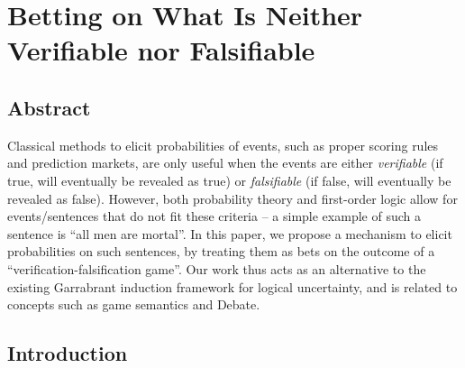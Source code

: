 \chapter{Betting on What Is Neither Verifiable nor Falsifiable}
\label{chap:nonverifiable-betting}





\section*{Abstract}
Classical methods to elicit probabilities of events, such as proper scoring rules and prediction markets, are only useful when the events are either \emph{verifiable} (if true, will eventually be revealed as true) or \emph{falsifiable} (if false, will eventually be revealed as false). However, both probability theory and first-order logic allow for events/sentences that do not fit these criteria -- a simple example of such a sentence is ``all men are mortal''. In this paper, we propose a mechanism to elicit probabilities on such sentences, by treating them as bets on the outcome of a ``verification-falsification game''. Our work thus acts as an alternative to the existing Garrabrant induction framework for logical uncertainty, and is related to concepts such as game semantics and Debate.


\section{Introduction}

